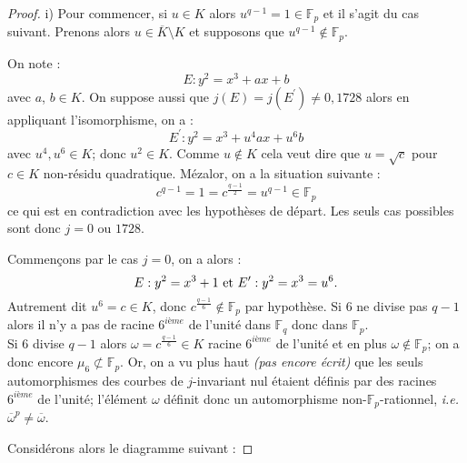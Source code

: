 \documentclass[a4paper]{article} %
\numberwithin{equation}{section}
\newcommand\GF[1]{\mathbb{F}_{#1}}
\begin{document}
\begin{proof} 
i) Pour commencer, si $u\in K$ alors $u^{q-1} = 1\in \GF{p}$ et il s'agit du cas
 suivant. Prenons alors $u\in\overline{K}\setminus K$ et supposons que $u^{q-1}
 \not\in \GF{p}$. \par
On note :
\[E : y^2 = x^3 + ax + b\] 
avec $a$, $b\in K$. On suppose aussi que $j(E) = j(E^{\prime})\neq 0, 1728$ 
alors en appliquant l'isomorphisme, on a :
\[E^{\prime} : y^2 = x^3 + u^4ax + u^6b\]
avec $u^4, u^6\in K$; donc $u^2\in K$. Comme $u\not\in K$ cela veut dire que 
$u = \sqrt{c}$ pour $c\in K$ non-résidu quadratique. Mézalor, on a la situation
 suivante :
\[c^{q-1} = 1 = c^{\tfrac{q-1}{2}} = u^{q-1}\in \GF{p}\]
ce qui est en contradiction avec les hypothèses de départ. Les seuls cas 
possibles sont donc $j = 0$ ou $1728$.\par
Commençons par le cas $j = 0$, on a alors :
\[E : y^2 = x^3 + 1 \textup{ et } E^{\prime} : y^2 = x^3 = u^6.\]
Autrement dit $u^6 = c \in K$, donc $c^{\tfrac{q-1}{6}} \notin \GF{p}$ 
par hypothèse. Si $6$ ne divise pas $q-1$ alors il n'y a pas de racine 
$6^{\textit{ième}}$ de l'unité dans $\GF{q}$ donc dans $\GF{p}$.\\
Si $6$ divise $q-1$ alors $\omega = c^{\tfrac{q-1}{6}}\in K$ racine 
$6^{\textit{ième}}$ de l'unité et en plus $\omega\notin\GF{p}$; on a donc encore
$\mu_6\not\subset\GF{p}$. Or, on a vu plus haut \textit{(pas encore écrit)} que
 les seuls automorphismes des courbes de $j$-invariant nul étaient définis par
 des racines $6^{\textit{ième}}$ de l'unité; l'élément $\omega$ définit donc un
 automorphisme non-$\GF{p}$-rationnel, \textit{i.e.} $\overline{\omega}^p\neq 
\overline{\omega}$.\par
Considérons alors le diagramme suivant :


\end{proof}
\end{document}
